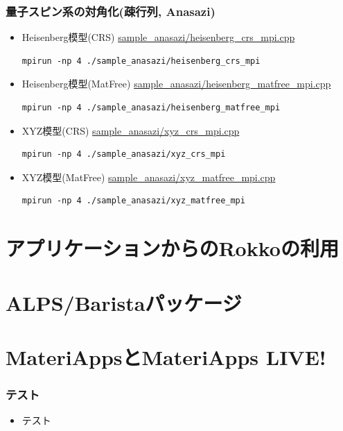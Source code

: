 \begin{frame}[c,fragile]
  \frametitle{量子スピン系の対角化(疎行列, Anasazi)}
  \begin{itemize}
  \item Heisenberg模型(CRS) \href{https://github.com/t-sakashita/rokko/blob/master/sample_anasazi/heisenberg_crs_mpi.cpp}{sample\_anasazi/heisenberg\_crs\_mpi.cpp}
\begin{lstlisting}[style=shstyle]
mpirun -np 4 ./sample_anasazi/heisenberg_crs_mpi
\end{lstlisting}
  \item Heisenberg模型(MatFree) \href{https://github.com/t-sakashita/rokko/blob/master/sample_anasazi/heisenberg_matfree_mpi.cpp}{sample\_anasazi/heisenberg\_matfree\_mpi.cpp}
\begin{lstlisting}[style=shstyle]
mpirun -np 4 ./sample_anasazi/heisenberg_matfree_mpi
\end{lstlisting}
  \item XYZ模型(CRS) \href{https://github.com/t-sakashita/rokko/blob/master/sample_anasazi/xyz_crs_mpi.cpp}{sample\_anasazi/xyz\_crs\_mpi.cpp}
\begin{lstlisting}[style=shstyle]
mpirun -np 4 ./sample_anasazi/xyz_crs_mpi
\end{lstlisting}
  \item XYZ模型(MatFree) \href{https://github.com/t-sakashita/rokko/blob/master/sample_anasazi/xyz_matfree_mpi.cpp}{sample\_anasazi/xyz\_matfree\_mpi.cpp}
\begin{lstlisting}[style=shstyle]
mpirun -np 4 ./sample_anasazi/xyz_matfree_mpi
\end{lstlisting}
  \end{itemize}
\end{frame}



\section{アプリケーションからのRokkoの利用}
\section{ALPS/Baristaパッケージ}
\section{MateriAppsとMateriApps LIVE!}

\begin{frame}
  \frametitle{テスト}
  \begin{itemize}
  \item テスト
  \end{itemize}
\end{frame}

